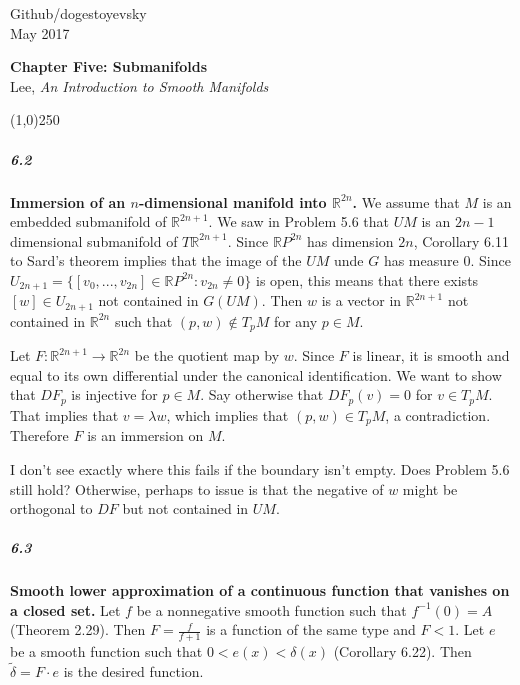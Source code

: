 \documentclass[10pt,letter]{article}
\begin{document}
\noindent Github/dogestoyevsky \\
May 2017
\begin{center}
\textbf{Chapter Five: Submanifolds}\\ Lee, \textit{An Introduction to Smooth Manifolds}

\line(1,0){250}
\end{center}

\subparagraph{6.2} {\bf Immersion of an $n$-dimensional manifold into $\mathbb{R}^{2n}$.} We assume that $M$ is an embedded submanifold of $\mathbb{R}^{2n+1}$. We saw in Problem 5.6 that $UM$ is an $2n-1$ dimensional submanifold of $T\mathbb{R}^{2n+1}$. Since $\mathbb{R}P^{2n}$ has dimension $2n$, Corollary 6.11 to Sard's theorem implies that the image of the $UM$ unde $G$ has measure $0$. Since $U_{2n+1} = \lbrace [v_0,...,v_{2n}] \in \mathbb{R}P^{2n}: v_{2n} \neq 0 \rbrace$ is open, this means that there exists $[w] \in U_{2n+1}$ not contained in $G(UM)$. Then $w$ is a vector in $\mathbb{R}^{2n+1}$ not contained in $\mathbb{R}^{2n}$ such that $(p,w) \not \in T_pM$ for any $p \in M$. 

Let $F: \mathbb{R}^{2n+1} \rightarrow \mathbb{R}^{2n}$ be the quotient map by $w$. Since $F$ is linear, it is smooth and equal to its own differential under the canonical identification. We want to show that $DF_p$ is injective for $p \in M$. Say otherwise that $DF_p(v) = 0$ for $v \in T_pM$. That implies that $v =  \lambda w$, which implies that $(p,w) \in T_pM$, a contradiction. Therefore $F$ is an immersion on $M$. 

I don't see exactly where this fails if the boundary isn't empty. Does Problem 5.6 still hold? Otherwise, perhaps to issue is that the negative of $w$ might be orthogonal to $DF$ but not contained in $UM$. 

\subparagraph{6.3} {\bf Smooth lower approximation of a continuous function that vanishes on a closed set.} Let $f$ be a nonnegative smooth function such that $f^{-1}(0) = A$ (Theorem 2.29). Then $F = \frac{f}{f+1}$ is a function of the same type and $F < 1$. Let $e$ be a smooth function such that $0 < e(x) < \delta(x)$ (Corollary 6.22). Then $\tilde{\delta} = F \cdot e$ is the desired function. 
\end{document}

